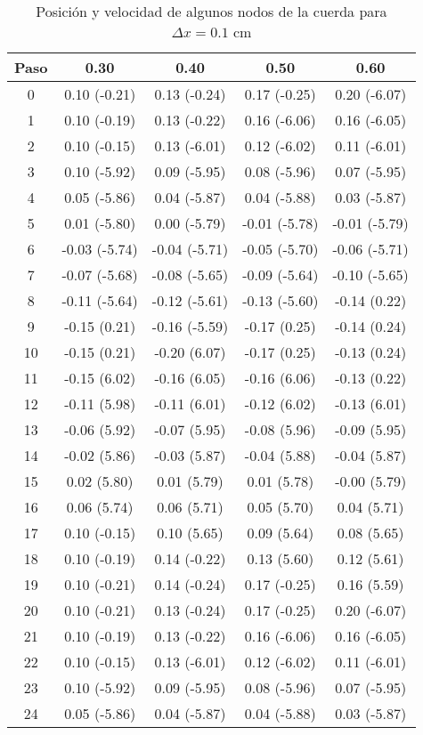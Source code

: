 \documentclass[11pt]{article}
\begin{document}
\begin{table}
\center
\begin{small}
\begin{tabular}{ c c c c c }
\hline
Paso & 0.30 & 0.40 & 0.50 & 0.60 \\
\hline
\hline
0 & 0.10 (-0.21) & 0.13 (-0.24) & 0.17 (-0.25) & 0.20 (-6.07) \\
1 & 0.10 (-0.19) & 0.13 (-0.22) & 0.16 (-6.06) & 0.16 (-6.05) \\
2 & 0.10 (-0.15) & 0.13 (-6.01) & 0.12 (-6.02) & 0.11 (-6.01) \\
3 & 0.10 (-5.92) & 0.09 (-5.95) & 0.08 (-5.96) & 0.07 (-5.95) \\
4 & 0.05 (-5.86) & 0.04 (-5.87) & 0.04 (-5.88) & 0.03 (-5.87) \\
5 & 0.01 (-5.80) & 0.00 (-5.79) & -0.01 (-5.78) & -0.01 (-5.79) \\
6 & -0.03 (-5.74) & -0.04 (-5.71) & -0.05 (-5.70) & -0.06 (-5.71) \\
7 & -0.07 (-5.68) & -0.08 (-5.65) & -0.09 (-5.64) & -0.10 (-5.65) \\
8 & -0.11 (-5.64) & -0.12 (-5.61) & -0.13 (-5.60) & -0.14 (0.22) \\
9 & -0.15 (0.21) & -0.16 (-5.59) & -0.17 (0.25) & -0.14 (0.24) \\
10 & -0.15 (0.21) & -0.20 (6.07) & -0.17 (0.25) & -0.13 (0.24) \\
11 & -0.15 (6.02) & -0.16 (6.05) & -0.16 (6.06) & -0.13 (0.22) \\
12 & -0.11 (5.98) & -0.11 (6.01) & -0.12 (6.02) & -0.13 (6.01) \\
13 & -0.06 (5.92) & -0.07 (5.95) & -0.08 (5.96) & -0.09 (5.95) \\
14 & -0.02 (5.86) & -0.03 (5.87) & -0.04 (5.88) & -0.04 (5.87) \\
15 & 0.02 (5.80) & 0.01 (5.79) & 0.01 (5.78) & -0.00 (5.79) \\
16 & 0.06 (5.74) & 0.06 (5.71) & 0.05 (5.70) & 0.04 (5.71) \\
17 & 0.10 (-0.15) & 0.10 (5.65) & 0.09 (5.64) & 0.08 (5.65) \\
18 & 0.10 (-0.19) & 0.14 (-0.22) & 0.13 (5.60) & 0.12 (5.61) \\
19 & 0.10 (-0.21) & 0.14 (-0.24) & 0.17 (-0.25) & 0.16 (5.59) \\
20 & 0.10 (-0.21) & 0.13 (-0.24) & 0.17 (-0.25) & 0.20 (-6.07) \\
21 & 0.10 (-0.19) & 0.13 (-0.22) & 0.16 (-6.06) & 0.16 (-6.05) \\
22 & 0.10 (-0.15) & 0.13 (-6.01) & 0.12 (-6.02) & 0.11 (-6.01) \\
23 & 0.10 (-5.92) & 0.09 (-5.95) & 0.08 (-5.96) & 0.07 (-5.95) \\
24 & 0.05 (-5.86) & 0.04 (-5.87) & 0.04 (-5.88) & 0.03 (-5.87) \\
\end{tabular}
\end{small}
\caption{Posición y velocidad de algunos nodos de la cuerda para $\Delta{x} = 0.1$ cm }
\label{tab:est_velocidad}
\end{table}
\end{document}
